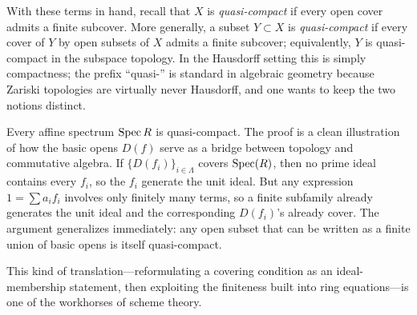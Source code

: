 \documentclass[12pt,reqno]{amsart}
\begin{document}
With these terms in hand, recall that $X$ is \emph{quasi-compact} if every open cover admits a finite subcover. More generally, a subset $Y \subset X$ is \emph{quasi-compact} if every cover of $Y$ by open subsets of $X$ admits a finite subcover; equivalently, $Y$ is quasi-compact in the subspace topology. In the Hausdorff setting this is simply compactness; the prefix ``quasi-'' is standard in algebraic geometry because Zariski topologies are virtually never Hausdorff, and one wants to keep the two notions distinct.
 
 Every affine spectrum $\operatorname{Spec} R$ is quasi-compact. The proof is a clean illustration of how the basic opens $D(f)$ serve as a bridge between topology and commutative algebra. If $\{D(f_i)\}_{i \in \Lambda}$ covers $\operatorname{Spec}(R)$, then no prime ideal contains every $f_i$, so the $f_i$ generate the unit ideal. But any expression $1 = \sum a_i f_i$ involves only finitely many terms, so a finite subfamily already generates the unit ideal and the corresponding $D(f_i)$'s already cover. The argument generalizes immediately: any open subset that can be written as a finite union of basic opens is itself quasi-compact.
  
This kind of translation---reformulating a covering condition as an ideal-membership statement, then exploiting the finiteness built into ring equations---is one of the workhorses of scheme theory.

\hrulefill
\end{document}
